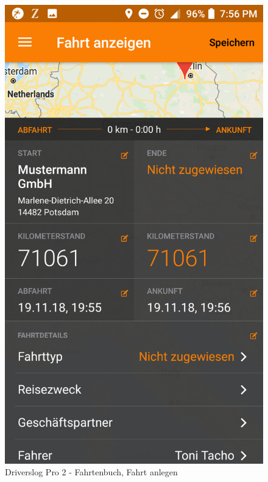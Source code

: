 \begin{figure}[H]
\begin{minipage}[b]{.4\linewidth}
        \includegraphics[scale=0.14]{img/pro4}
        \caption{\label{img:img/pro4}Driverslog Pro 2 - Fahrtenbuch, Fahrt anlegen}
    \end{minipage}
\end{figure}


